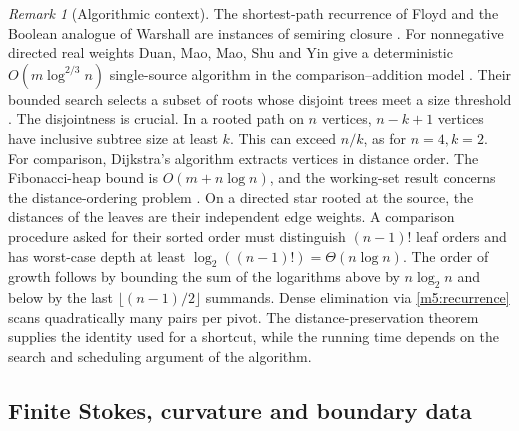 \documentclass[11pt,reqno]{amsart}
\theoremstyle{definition}
\theoremstyle{remark}
\newtheorem{remark}[theorem]{Remark}
\numberwithin{equation}{section}
\begin{document}
\begin{remark}[Algorithmic context]\label{m5:algorithm}
The shortest-path recurrence of Floyd and the Boolean analogue of
Warshall are instances of semiring closure \cite{m5:Floyd,m5:Warshall,m5:Mohri}.
For nonnegative directed real weights Duan, Mao, Mao, Shu and Yin
give a deterministic \(O(m\log^{2/3}n)\) single-source algorithm in
the comparison--addition model \cite[Thm.~1.1]{m5:Duan}.
Their bounded search selects a subset of roots whose disjoint
trees meet a size threshold \cite[Lem.~3.2]{m5:Duan}.
The disjointness is crucial. In a rooted path on \(n\) vertices,
\(n-k+1\) vertices have inclusive subtree size at least \(k\).
This can exceed \(n/k\), as for \(n=4,k=2\).
For comparison, Dijkstra's algorithm extracts vertices in distance order.
The Fibonacci-heap bound is \(O(m+n\log n)\), and the working-set
result concerns the distance-ordering problem
\cite{m5:Dijkstra,m5:FT,m5:Haeupler}.
On a directed star rooted at the source, the distances of the leaves
are their independent edge weights. A comparison procedure asked for
their sorted order must distinguish \((n-1)!\) leaf orders and has
worst-case depth at least \(\log_2((n-1)!)=\Theta(n\log n)\).
The order of growth follows by bounding the sum of the logarithms above
by \(n\log_2 n\) and below by the last \(\lfloor(n-1)/2\rfloor\)
summands. Dense elimination via \eqref{m5:recurrence} scans quadratically
many pairs per pivot. The distance-preservation theorem supplies the
identity used for a shortcut, while the running time depends on the
search and scheduling argument of the algorithm.
\end{remark}

\subsection{Finite Stokes, curvature and boundary data}
\end{document}
